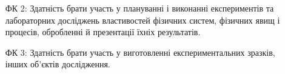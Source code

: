 \documentclass{Syllabus}
\begin{document}
\begin{enumerate}
	\item [ФК 2:] Здатність брати участь у плануванні і виконанні експериментів та лабораторних досліджень властивостей фізичних систем, фізичних явищ і процесів, обробленні й презентації їхніх результатів.
	\item [ФК 3:] Здатність брати участь у виготовленні експериментальних зразків, інших об'єктів дослідження.
\end{enumerate}
\end{document}
